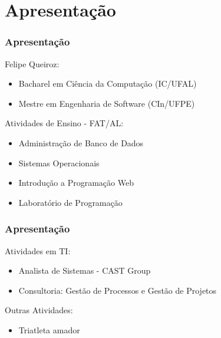 \section{Apresentação}

\begin{frame}
	\frametitle{Apresentação}
	Felipe Queiroz:
	\begin{itemize}
		\item Bacharel em Ciência da Computação (IC/UFAL)
		\item Mestre em Engenharia de Software (CIn/UFPE)
	\end{itemize}

	Atividades de Ensino - FAT/AL:
	\begin{itemize}
		\item Administração de Banco de Dados
		\item Sistemas Operacionais
		\item Introdução a Programação Web
		\item Laboratório de Programação
	\end{itemize}
\end{frame}

\begin{frame}
	\frametitle{Apresentação}
	Atividades em TI:
	\begin{itemize}
		\item Analista de Sistemas - CAST Group
		\item Consultoria: Gestão de Processos e Gestão de Projetos
	\end{itemize}

	Outras Atividades:
	\begin{itemize}
		\item Triatleta amador
	\end{itemize}
\end{frame}

